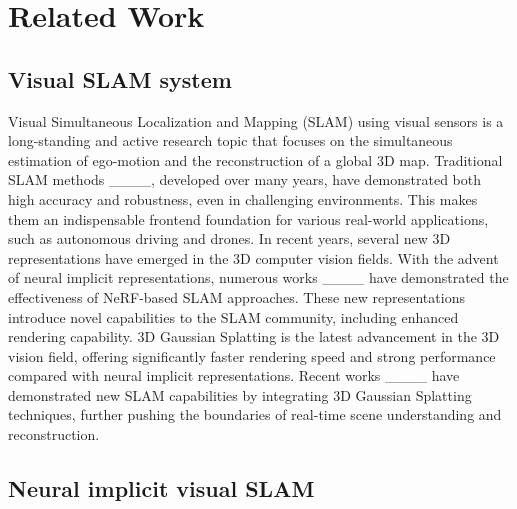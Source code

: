 \section{Related Work}
\subsection{Visual SLAM system}

    Visual Simultaneous Localization and Mapping (SLAM) using visual sensors is a long-standing and active research topic that focuses on the simultaneous estimation of ego-motion and the reconstruction of a global 3D map. 
    Traditional SLAM methods ____, developed over many years, have demonstrated both high accuracy and robustness, even in challenging environments. This makes them an indispensable frontend foundation for various real-world applications, such as autonomous driving and drones.
    In recent years, several new 3D representations have emerged in the 3D computer vision fields. With the advent of neural implicit representations, numerous works ____ have demonstrated the effectiveness of NeRF-based SLAM approaches. These new representations introduce novel capabilities to the SLAM community, including enhanced rendering capability. %
    3D Gaussian Splatting is the latest advancement in the 3D vision field, offering significantly faster rendering speed and strong performance compared with neural implicit representations. Recent works ____ have demonstrated new SLAM capabilities by integrating 3D Gaussian Splatting techniques, further pushing the boundaries of real-time scene understanding and reconstruction.

\subsection{Neural implicit visual SLAM}

